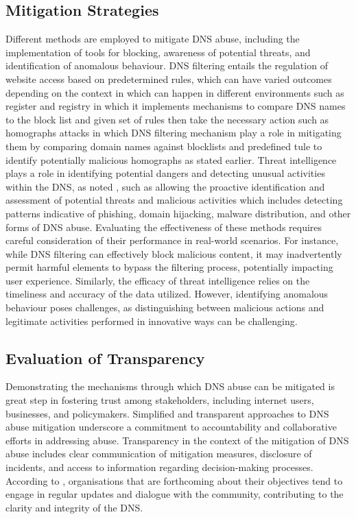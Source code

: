 \subsection{Mitigation Strategies}

Different methods are employed to mitigate DNS abuse, including the implementation of tools for blocking, awareness of potential threats, and identification of anomalous behaviour. DNS filtering entails the regulation of website access based on predetermined rules, which can have varied outcomes depending on the context in which can happen in different environments such as register and registry in which it implements mechanisms to compare DNS names to the block list and given set of rules then take the necessary action such as homographs attacks in which DNS filtering mechanism play a role in mitigating them by comparing domain names against blocklists and predefined tule to identify potentially malicious homographs as stated earlier. Threat intelligence plays a role in identifying potential dangers and detecting unusual activities within the DNS, as noted \cite{rizvi2022application}, such as allowing the proactive identification and assessment of potential threats and malicious activities which includes detecting patterns indicative of phishing, domain hijacking, malware distribution, and other forms of DNS abuse. Evaluating the effectiveness of these methods requires careful consideration of their performance in real-world scenarios. For instance, while DNS filtering can effectively block malicious content, it may inadvertently permit harmful elements to bypass the filtering process, potentially impacting user experience. Similarly, the efficacy of threat intelligence relies on the timeliness and accuracy of the data utilized. However, identifying anomalous behaviour poses challenges, as distinguishing between malicious actions and legitimate activities performed in innovative ways can be challenging.

\subsection{Evaluation of Transparency}

Demonstrating the mechanisms through which DNS abuse can be mitigated is great step in fostering trust among stakeholders, including internet users, businesses, and policymakers. Simplified and transparent approaches to DNS abuse mitigation underscore a commitment to accountability and collaborative efforts in addressing abuse. Transparency in the context of the mitigation of DNS abuse includes clear communication of mitigation measures, disclosure of incidents, and access to information regarding decision-making processes. According to \cite{chaganti2023survey}, organisations that are forthcoming about their objectives tend to engage in regular updates and dialogue with the community, contributing to the clarity and integrity of the DNS.

